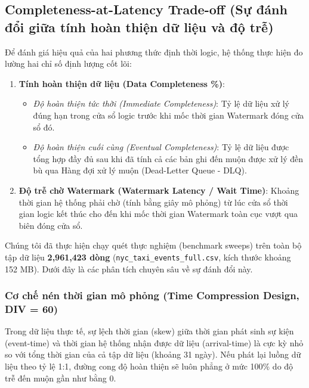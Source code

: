 \documentclass[12pt,a4paper]{article}
\begin{document}
\subsection{Completeness-at-Latency Trade-off (Sự đánh đổi giữa tính hoàn thiện dữ liệu và độ trễ)}

Để đánh giá hiệu quả của hai phương thức định thời logic, hệ thống thực hiện đo lường hai chỉ số định lượng cốt lõi:
\begin{enumerate}
    \item \textbf{Tính hoàn thiện dữ liệu (Data Completeness \%)}:
    \begin{itemize}
        \item \textit{Độ hoàn thiện tức thời (Immediate Completeness)}: Tỷ lệ dữ liệu xử lý đúng hạn trong cửa sổ logic trước khi mốc thời gian Watermark đóng cửa sổ đó.
        \item \textit{Độ hoàn thiện cuối cùng (Eventual Completeness)}: Tỷ lệ dữ liệu được tổng hợp đầy đủ sau khi đã tính cả các bản ghi đến muộn được xử lý đền bù qua Hàng đợi xử lý muộn (Dead-Letter Queue - DLQ).
    \end{itemize}
    \item \textbf{Độ trễ chờ Watermark (Watermark Latency / Wait Time)}: Khoảng thời gian hệ thống phải chờ (tính bằng giây mô phỏng) từ lúc cửa sổ thời gian logic kết thúc cho đến khi mốc thời gian Watermark toàn cục vượt qua biên đóng cửa sổ.
\end{enumerate}

Chúng tôi đã thực hiện chạy quét thực nghiệm (benchmark sweeps) trên toàn bộ tập dữ liệu \textbf{2,961,423 dòng} (\texttt{nyc\_taxi\_events\_full.csv}, kích thước khoảng 152 MB). Dưới đây là các phân tích chuyên sâu về sự đánh đổi này.

\subsubsection{Cơ chế nén thời gian mô phỏng (Time Compression Design, DIV = 60)}
Trong dữ liệu thực tế, sự lệch thời gian (skew) giữa thời gian phát sinh sự kiện (event-time) và thời gian hệ thống nhận được dữ liệu (arrival-time) là cực kỳ nhỏ so với tổng thời gian của cả tập dữ liệu (khoảng 31 ngày). Nếu phát lại luồng dữ liệu theo tỷ lệ 1:1, đường cong độ hoàn thiện sẽ luôn phẳng ở mức 100\% do độ trễ đến muộn gần như bằng 0.
\end{document}
